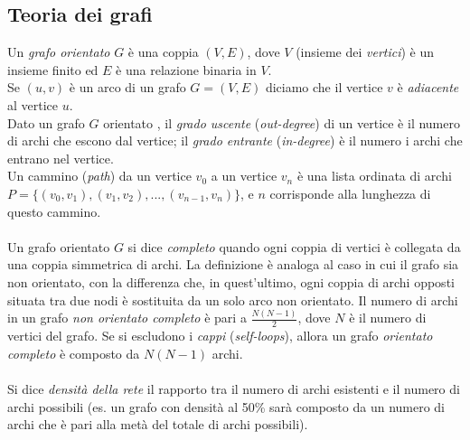 \documentclass[a4paper,12pt]{article}
\begin{document}
\subsection{Teoria dei grafi}
\label{subsec:graph}
Un \textit{grafo orientato} $G$ \cite{cormen} è una coppia $(V,E)$, dove $V$ (insieme dei \textit{vertici}) è un insieme finito ed $E$ è una relazione binaria in $V$.\\
Se $(u,v)$ è un arco \cite{cormen} di un grafo $G = (V,E)$ diciamo che il vertice $v$ è \textit{adiacente} al vertice $u$.\\
Dato un grafo $G$ orientato \cite{cormen}, il \textit{grado uscente} (\textit{out-degree}) di un vertice è il numero di archi che escono dal vertice; il \textit{grado entrante} (\textit{in-degree}) è il numero i archi che entrano nel vertice. \\
Un cammino (\textit{path}) \cite{barabasi} da un vertice $v_0$ a un vertice $v_n$ è una lista ordinata di archi $P = \{(v_0,v_1),(v_1,v_2),...,(v_{n-1},v_n)\}$, e $n$ corrisponde alla lunghezza di questo cammino. \\
\\
Un grafo orientato $G$ si dice \textit{completo} \cite{barabasi} quando ogni coppia di vertici è collegata da una coppia simmetrica di archi. La definizione è analoga al caso in cui il grafo sia non orientato, con la differenza che, in quest'ultimo, ogni coppia di archi opposti situata tra due nodi è sostituita da un solo arco non orientato. Il numero di archi \cite{barabasi} in un grafo \textit{non orientato completo} è pari a $\tfrac{N(N-1)}{2}$, dove $N$ è il numero di vertici del grafo. Se si escludono i \textit{cappi} (\textit{self-loops}), allora un grafo \textit{orientato completo} è composto da $N(N-1)$ archi. \\
\\
Si dice \textit{densità della rete} il rapporto tra il numero di archi esistenti e il numero di archi possibili (es. un grafo con densità al 50\% sarà composto da un numero di archi che è pari alla metà del totale di archi possibili).
\end{document}
